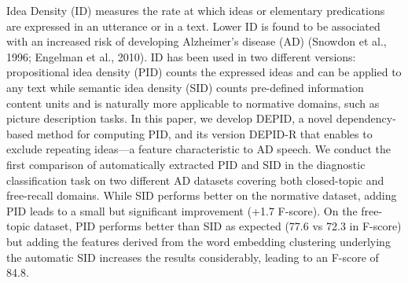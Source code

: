 Idea Density (ID) measures the rate at which ideas or elementary predications are expressed in an utterance or in a text. Lower ID is found to be associated with an increased risk of developing Alzheimer's disease (AD) (Snowdon et al., 1996; Engelman et al., 2010). ID has been used in two different versions: propositional idea density (PID) counts the expressed ideas and can be applied to any text while semantic idea density (SID) counts pre-defined information content units and is naturally more applicable to normative domains, such as picture description tasks. In this paper, we develop DEPID, a novel dependency-based method for computing PID, and its version DEPID-R that enables to exclude repeating ideas---a feature characteristic to AD speech.  We conduct the first comparison of automatically extracted PID and SID in the diagnostic classification task on two different AD datasets covering both closed-topic and free-recall domains. While SID performs better on the normative dataset, adding PID leads to a small but significant improvement (+1.7 F-score). On the free-topic dataset, PID performs better than SID as expected (77.6 vs 72.3 in F-score) but adding the features derived from the word embedding clustering underlying the automatic SID increases the results considerably, leading to an F-score of 84.8.
